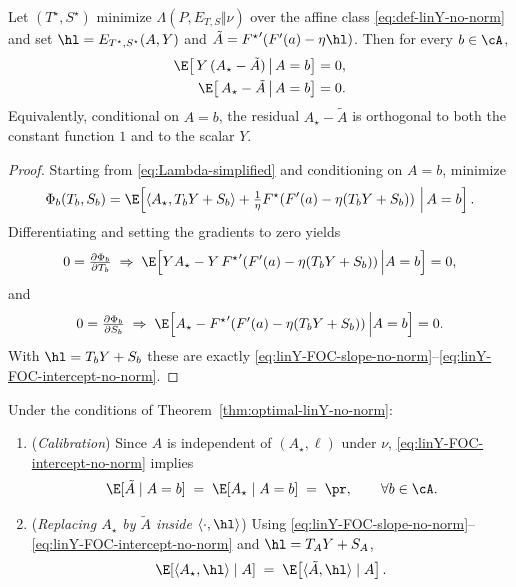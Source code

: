 \begin{theorem}
    \label{thm:optimal-linY-no-norm}
    Let $(T^\star,S^\star)$ minimize $\Lambda(P,E_{T,S}\Vert \nu)$ over the affine
    class \eqref{eq:def-linY-no-norm} and set $\hl=E_{T^\star,S^\star}(A,Y)$ and
    $\tilde{A}={F^\star}'(F'(a)-\eta \hl)$. Then for every $b\in\cA$,
    \begin{align}
        \E\!\left[\, Y\,(A_\star-\tilde{A}) \,\big|\, A=b \right] & = 0,
        \label{eq:linY-FOC-slope-no-norm}
        \\
        \E\!\left[\, A_\star-\tilde{A} \,\big|\, A=b \right]      & = 0.
        \label{eq:linY-FOC-intercept-no-norm}
    \end{align}
    Equivalently, conditional on $A=b$, the residual $A_\star-\tilde{A}$ is
    orthogonal to both the constant function $1$ and to the scalar $Y$.
\end{theorem}

\begin{proof}
    Starting from \eqref{eq:Lambda-simplified} and conditioning on $A=b$,
    minimize
    \[
        \Phi_b(T_b,S_b)
        =
        \E\!\left[
            \left\langle A_\star, T_b Y + S_b \right\rangle
            + \tfrac{1}{\eta} F^\star\!\left(F'(a)-\eta(T_b Y + S_b)\right)
            \,\Big|\, A=b
            \right].
    \]
    Differentiating and setting the gradients to zero yields
    \[
        0=\tfrac{\partial \Phi_b}{\partial T_b}
        \;\Rightarrow\;
        \E\!\left[ Y A_\star - Y\,{F^\star}'\!\left(F'(a)-\eta(T_b Y + S_b)\right)\Big|A=b\right]=0,
    \]
    and
    \[
        0=\tfrac{\partial \Phi_b}{\partial S_b}
        \;\Rightarrow\;
        \E\!\left[ A_\star - {F^\star}'\!\left(F'(a)-\eta(T_b Y + S_b)\right)\Big|A=b\right]=0.
    \]
    With $\hl=T_b Y + S_b$ these are exactly
    \eqref{eq:linY-FOC-slope-no-norm}--\eqref{eq:linY-FOC-intercept-no-norm}.
\end{proof}

\begin{lemma}
    \label{lem:linY-calibration-replace-no-norm}
    Under the conditions of Theorem~\ref{thm:optimal-linY-no-norm}:
    \begin{enumerate}
        \item (\emph{Calibration}) Since $A$ is independent of $(A_\star,\ell)$ under $\nu$,
              \eqref{eq:linY-FOC-intercept-no-norm} implies
              \[
                  \E[\tilde{A}\mid A=b] \;=\; \E[A_\star\mid A=b] \;=\; \pr,\qquad\forall b\in\cA.
              \]
        \item (\emph{Replacing $A_\star$ by $\tilde{A}$ inside $\langle\cdot,\hl\rangle$})
              Using \eqref{eq:linY-FOC-slope-no-norm}--\eqref{eq:linY-FOC-intercept-no-norm} and
              $\hl=T_A Y + S_A$,
              \[
                  \E\!\left[\langle A_\star,\hl\rangle\mid A\right]
                  \;=\;
                  \E\!\left[\langle \tilde{A},\hl\rangle\mid A\right].
              \]
    \end{enumerate}
\end{lemma}

